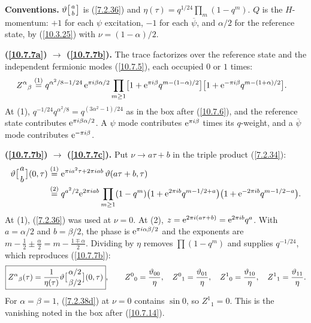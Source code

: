 	\begin{tcolorbox}[breakable]
		\begin{remark}
			\textbf{Conventions.} $\vartheta\bigl[{a\atop b}\bigr]$ is (\ref{7.2.36}) and $\eta(\tau)=q^{1/24}\prod_m(1-q^m)$. $Q$ is the $H$-momentum: $+1$ for each $\psi$ excitation, $-1$ for each $\overline\psi$, and $\alpha/2$ for the reference state, by (\ref{10.3.25}) with $\nu=(1-\alpha)/2$.

			\textbf{(\ref{10.7.7a}) $\to$ (\ref{10.7.7b}).} The trace factorizes over the reference state and the independent fermionic modes (\ref{10.7.5}), each occupied $0$ or $1$ times:
			\begin{align*}
				Z^{\alpha}{}_{\beta}&\overset{(1)}{=}q^{\alpha^{2}/8-1/24}\,\mathrm{e}^{\pi i\beta\alpha/2}\prod_{m\ge1}\bigl[1+\mathrm{e}^{\pi i\beta}q^{m-(1-\alpha)/2}\bigr]\bigl[1+\mathrm{e}^{-\pi i\beta}q^{m-(1+\alpha)/2}\bigr] .
			\end{align*}
			At (1), $q^{-1/24}q^{\alpha^{2}/8}=q^{(3\alpha^{2}-1)/24}$ as in the box after (\ref{10.7.6}), and the reference state contributes $\mathrm{e}^{\pi i\beta\alpha/2}$. A $\psi$ mode contributes $\mathrm{e}^{\pi i\beta}$ times its $q$-weight, and a $\overline\psi$ mode contributes $\mathrm{e}^{-\pi i\beta}$.

			\textbf{(\ref{10.7.7b}) $\to$ (\ref{10.7.7c}).} Put $\nu\to a\tau+b$ in the triple product (\ref{7.2.34}):
			\begin{align*}
				\vartheta\bigl[{a\atop b}\bigr](0,\tau)&\overset{(1)}{=}\mathrm{e}^{\pi i a^{2}\tau+2\pi i ab}\,\vartheta(a\tau+b,\tau)\\
				&\overset{(2)}{=}q^{a^{2}/2}\mathrm{e}^{2\pi i ab}\prod_{m\ge1}(1-q^{m})\bigl(1+\mathrm{e}^{2\pi i b}q^{m-1/2+a}\bigr)\bigl(1+\mathrm{e}^{-2\pi i b}q^{m-1/2-a}\bigr) .
			\end{align*}
			At (1), (\ref{7.2.36}) was used at $\nu=0$. At (2), $z=\mathrm{e}^{2\pi i(a\tau+b)}=\mathrm{e}^{2\pi i b}q^{a}$. With $a=\alpha/2$ and $b=\beta/2$, the phase is $\mathrm{e}^{\pi i\alpha\beta/2}$ and the exponents are $m-\tfrac12\pm\tfrac\alpha2=m-\tfrac{1\mp\alpha}{2}$. Dividing by $\eta$ removes $\prod(1-q^m)$ and supplies $q^{-1/24}$, which reproduces (\ref{10.7.7b}):
			\begin{equation*}
				\boxed{Z^{\alpha}{}_{\beta}(\tau)=\frac{1}{\eta(\tau)}\vartheta\bigl[{\alpha/2\atop\beta/2}\bigr](0,\tau)},\qquad
				Z^0{}_0=\frac{\vartheta_{00}}{\eta},\quad Z^0{}_1=\frac{\vartheta_{01}}{\eta},\quad Z^1{}_0=\frac{\vartheta_{10}}{\eta},\quad Z^1{}_1=\frac{\vartheta_{11}}{\eta} .
			\end{equation*}
			For $\alpha=\beta=1$, (\ref{7.2.38d}) at $\nu=0$ contains $\sin0$, so $Z^1{}_1=0$. This is the vanishing noted in the box after (\ref{10.7.14}).
		\end{remark}
	\end{tcolorbox}
	
